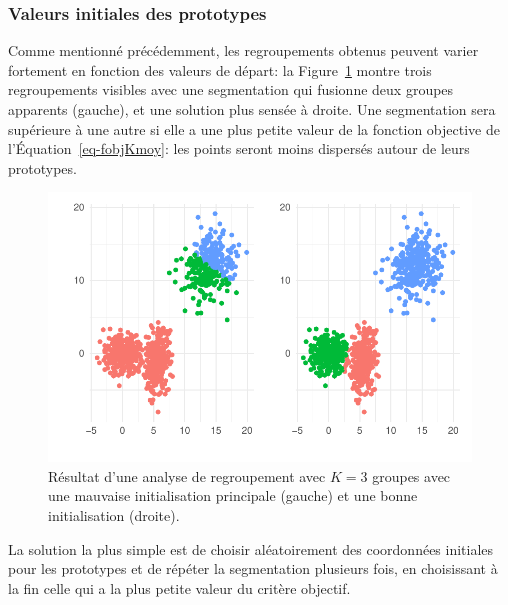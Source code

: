 \documentclass[
  11pt,
  letterpaper,
]{scrbook}
\theoremstyle{definition}
\theoremstyle{remark}
\begin{document}
\hypertarget{valeurs-initiales-des-prototypes}{%
\subsubsection*{Valeurs initiales des
prototypes}\label{valeurs-initiales-des-prototypes}}

Comme mentionné précédemment, les regroupements obtenus peuvent varier
fortement en fonction des valeurs de départ: la
Figure~\ref{fig-kmoyenne-mauvais} montre trois regroupements visibles
avec une segmentation qui fusionne deux groupes apparents (gauche), et
une solution plus sensée à droite. Une segmentation sera supérieure à
une autre si elle a une plus petite valeur de la fonction objective de
l'Équation~\ref{eq-fobjKmoy}: les points seront moins dispersés autour
de leurs prototypes.

\begin{figure}[ht!]

{\centering \includegraphics{regroupements_files/figure-pdf/fig-kmoyenne-mauvais-1.pdf}

}

\caption{\label{fig-kmoyenne-mauvais}Résultat d'une analyse de
regroupement avec \(K=3\) groupes avec une mauvaise initialisation
principale (gauche) et une bonne initialisation (droite).}

\end{figure}

La solution la plus simple est de choisir aléatoirement des coordonnées
initiales pour les prototypes et de répéter la segmentation plusieurs
fois, en choisissant à la fin celle qui a la plus petite valeur du
critère objectif.
\end{document}
